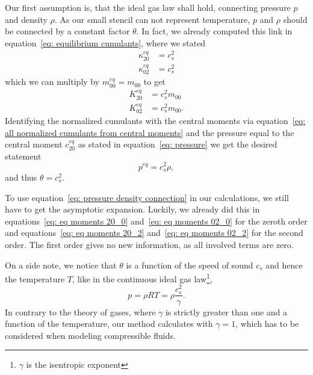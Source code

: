 Our first assumption is, that the ideal gas law shall hold, connecting pressure $p$ and density $\rho$.
As our small stencil can not represent temperature, $p$ and $\rho$ should be connected by a constant factor $\theta$.
In fact, we already computed this link in equation~\eqref{eq: equilibrium cumulants}, where we stated
\begin{equation*}
  \begin{aligned}
    \kappa_{20}^{eq} & = c_s^2  \\
    \kappa_{02}^{eq} & = c_s^2
  \end{aligned}
\end{equation*}
which we can multiply by $m_{00}^{eq} = m_{00}$ to get
\begin{equation}
\label{eq: pressure density connection}
  \begin{aligned}
    K_{20}^{eq} & = c_s^2 m_{00}  \\
    K_{02}^{eq} & = c_s^2 m_{00}.
  \end{aligned}
\end{equation}
Identifying the normalized cumulants with the central moments via equation~\eqref{eq: all normalized cumulants from central moments} and the pressure equal to the central moment $c_{20}^{eq}$ as stated in equation~\eqref{eq: pressure} we get the desired statement
\begin{equation}
\label{eq: pressure density connection quantities}
  p^{eq}  = c_s^2 \rho,
\end{equation}
and thus $\theta=c_s^2$.

To use equation~\eqref{eq: pressure density connection} in our calculations, we still have to get the asymptotic expansion.
Luckily, we already did this in equations~\eqref{eq: eq moments 20_0} and~\eqref{eq: eq moments 02_0} for the zeroth order and equations~\eqref{eq: eq moments 20_2} and~\eqref{eq: eq moments 02_2} for the second order.
The first order gives no new information, as all involved terms are zero.

On a side note, we notice that $\theta$ is a function of the speed of sound $c_s$ and hence the temperature $T$, like in the continuous ideal gas law\footnote{$\gamma$ is the isentropic exponent },
\begin{equation*}
  p=\rho RT = \rho \frac{c_s^2}{\gamma}.
\end{equation*}
In contrary to the theory of gases, where $\gamma$ is strictly greater than one and a function of the temperature, our method calculates with $\gamma=1$, which has to be considered when modeling compressible fluids.
